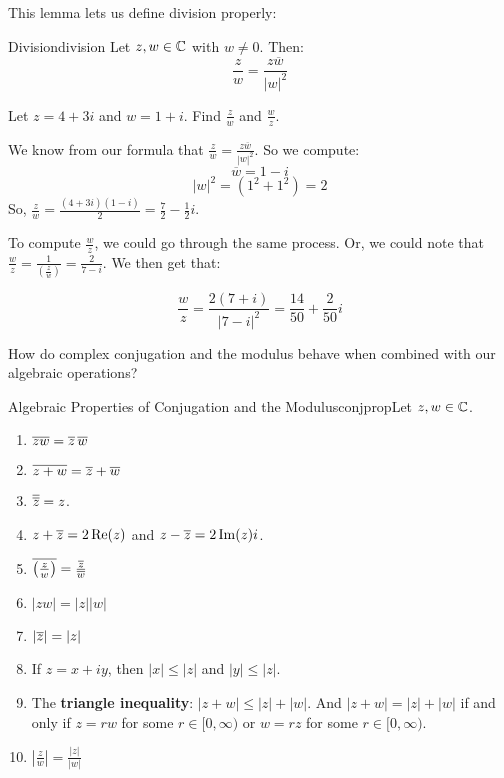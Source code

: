 This lemma lets us define division properly:

\begin{defbo}{Division}{division} 
Let $z,w\in \mathbb{C}$ with $w\ne 0$. Then:
$$\frac{z}{w} = \frac{z\overline{w}}{|w|^2}$$
\end{defbo}


\begin{ex}{}{} Let $z = 4 + 3i$ and $w = 1 + i$. Find $\frac{z}{w}$ and $\frac{w}{z}$.

We know from our formula that $\frac{z}{w} = \frac{z\overline{w}}{|w|^2}$. So we compute:
$$\overline{w} = 1 - i$$
$$|w|^2 = (1^2 + 1^2)  = 2$$
So, $\frac{z}{w} = \frac{(4 + 3i)(1 - i)}{2} = \frac{7}{2} -\frac{1}{2}i$.


To compute $\frac{w}{z}$, we could go through the same process. Or, we could note that $\frac{w}{z} = \frac{1}{\left(\frac{z}{w}\right)} = \frac{2}{7 - i}$. We then get that:

$$\frac{w}{z} = \frac{2(7+i)}{|7-i|^2} = \frac{14}{50} + \frac{2}{50}i$$

\end{ex}

How do complex conjugation and the modulus behave when combined with our algebraic operations?

\begin{thmbo}{Algebraic Properties of Conjugation and the Modulus}{conjprop}Let $z,w \in \mathbb{C}$.

\begin{enumerate}
\item $\overline{zw} = \overline{z}\,\overline{w}$
\item $\overline{z + w} = \overline{z} + \overline{w}$
\item $\overline{\overline{z}} = z$.
\item $z + \overline{z} = 2\operatorname{Re}(z)$ and $z - \overline{z} = 2\operatorname{Im}(z)i$.
\item $\overline{\left(\frac{z}{w}\right)} = \frac{\overline{z}}{\overline{w}}$
\item $|zw| = |z||w|$
\item $|\overline{z}| = |z|$
\item If $z = x + iy$, then $|x| \le |z|$ and $|y| \le |z|$.
\item The {\bf triangle inequality}: $|z + w| \le |z| + |w|$. And $|z + w| = |z| + |w|$ if and only if $z = rw$ for some $r\in [0,\infty)$ or $w = rz$ for some $r\in [0,\infty)$.
\item $\left|\frac{z}{w}\right| = \frac{|z|}{|w|}$
\end{enumerate}

\end{thmbo}

